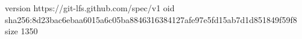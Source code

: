 version https://git-lfs.github.com/spec/v1
oid sha256:8d23bac6ebaa6015a6c05ba8846316384127afe97e5fd15ab7d1d851849f59f8
size 1350
